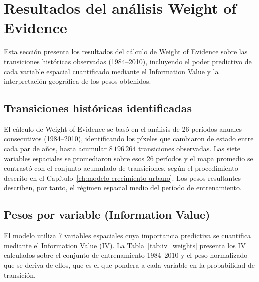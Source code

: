 \section{Resultados del análisis Weight of Evidence}

Esta sección presenta los resultados del cálculo de Weight of Evidence sobre las transiciones históricas observadas (1984--2010), incluyendo el poder predictivo de cada variable espacial cuantificado mediante el Information Value y la interpretación geográfica de los pesos obtenidos.

\subsection{Transiciones históricas identificadas}

El cálculo de Weight of Evidence se basó en el análisis de 26 períodos anuales consecutivos (1984--2010), identificando los píxeles que cambiaron de estado entre cada par de años, hasta acumular $8\,196\,264$ transiciones observadas. Las siete variables espaciales se promediaron sobre esos 26 períodos y el mapa promedio se contrastó con el conjunto acumulado de transiciones, según el procedimiento descrito en el Capítulo~\ref{ch:modelo-crecimiento-urbano}. Los pesos resultantes describen, por tanto, el régimen espacial medio del período de entrenamiento.

\subsection{Pesos por variable (Information Value)}

El modelo utiliza 7 variables espaciales cuya importancia predictiva se cuantifica mediante el Information Value (IV). La Tabla~\ref{tab:iv_weights} presenta los IV calculados sobre el conjunto de entrenamiento 1984--2010 y el peso normalizado que se deriva de ellos, que es el que pondera a cada variable en la probabilidad de transición.

